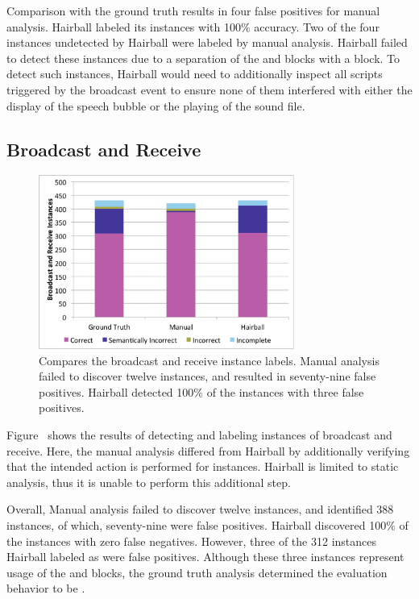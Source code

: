 Comparison with the ground truth results in four false positives for manual
analysis. Hairball labeled its instances with 100\% accuracy. Two of the four
instances undetected by Hairball were labeled \incom{} by manual
analysis. Hairball failed to detect these instances due to a separation of the
\say{} and \playsound{} blocks with a \broadcast{} block. To detect such
instances, Hairball would need to additionally inspect all scripts triggered by
the broadcast event to ensure none of them interfered with either the display
of the speech bubble or the playing of the sound file.

\subsection{Broadcast and Receive}
\begin{figure}[!t]
\centering
\includegraphics[trim=.3in .15in .3in .15in, clip,
  width=3.3in]{graphs/AutoBroadcastReceive.eps}
\caption{Compares the broadcast and receive instance labels. Manual analysis
  failed to discover twelve instances, and resulted in seventy-nine false
  positives. Hairball detected 100\% of the instances with three false
  positives.}
\end{figure}

Figure~ shows the results of detecting and
labeling instances of broadcast and receive. Here, the manual analysis differed
from Hairball by additionally verifying that the intended action is performed
for \correct{} instances. Hairball is limited to static analysis, thus it is
unable to perform this additional step.

Overall, Manual analysis failed to discover twelve instances, and identified
388 \correct{} instances, of which, seventy-nine were false positives. Hairball
discovered 100\% of the instances with zero false negatives. However, three of
the 312 instances Hairball labeled as \correct{} were false positives. Although
these three instances represent \correct{} usage of the \broadcast{} and
\receive{} blocks, the ground truth analysis determined the evaluation behavior
to be \incor{}.



